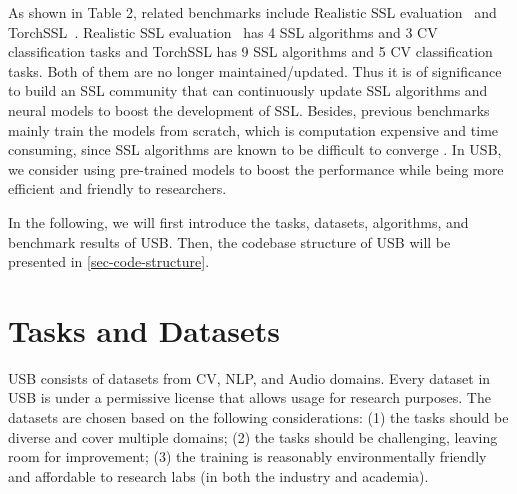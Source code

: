 \documentclass{article}
\newcommand{\datasetnum}{\xspace}
\newcommand{\ourmethod}{USB\xspace}
\begin{document}
As shown in Table 2, related benchmarks include Realistic SSL evaluation~\cite{oliver2018realistic} and TorchSSL~\cite{zhang2021flexmatch}. Realistic SSL evaluation~\cite{oliver2018realistic} has 4 SSL algorithms and 3 CV classification tasks and TorchSSL has 9 SSL algorithms and 5 CV classification tasks. Both of them are no longer maintained/updated. Thus it is of significance to build an SSL community that can continuously update SSL algorithms and neural models to boost the development of SSL. Besides, previous benchmarks mainly train the models from scratch, which is computation expensive and time consuming, since SSL algorithms are known to be difficult to converge \cite{athiwaratkun2018there}. In USB, we consider using pre-trained models to boost the performance while being more efficient and friendly to researchers.







In the following, we will first introduce the tasks, datasets, algorithms, and benchmark results of USB.
Then, the codebase structure of USB will be presented in \cref{sec-code-structure}.


\begin{table}[t]
\centering
\caption{The comparison between USB and other related benchmarks.}
\label{tab:related-work}
\end{table}

\section{Tasks and Datasets}
\ourmethod consists of \datasetnum datasets from CV, NLP, and Audio domains.
Every dataset in USB is under a permissive license that allows usage for research purposes.
The datasets are chosen based on the following considerations: (1) the tasks should be diverse and cover multiple domains; (2) the tasks should be challenging, leaving room for improvement; (3) the training is reasonably environmentally friendly and affordable to research labs (in both the industry and academia).
\end{document}
